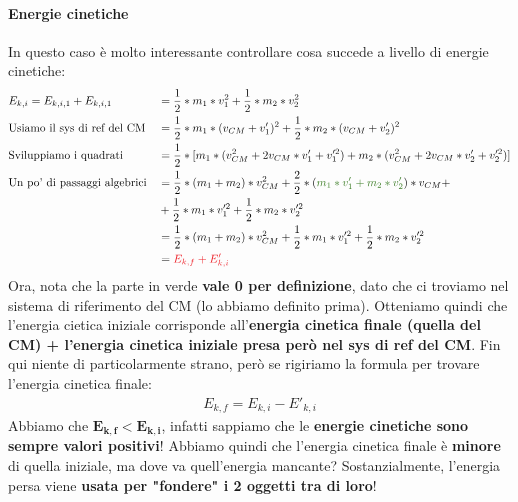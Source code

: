             \paragraph{Energie cinetiche}
                In questo caso è molto interessante controllare cosa succede a livello di energie cinetiche:
                \begin{align*}
                    & E_{k,i}=E_{k,i,1}+E_{k,i,1} &&=\frac{1}{2}*m_1*v_1^2+\frac{1}{2}*m_2*v_2^2\\
                    & \textrm{Usiamo il sys di ref del CM}
                    &&=\frac{1}{2}*m_1*(v_{CM}+v'_1)^2+\frac{1}{2}*m_2*(v_{CM}+v'_2)^2\\
                    & \textrm{Sviluppiamo i quadrati}
                    &&=\frac{1}{2}*[m_1*(v_{CM}^2+2v_{CM}*v'_1+v'^2_1)+m_2*(v_{CM} ^2+2v_{CM}*v'_2+v'^2_2)]\\
                    & \textrm{Un po' di passaggi algebrici}
                    &&=\frac{1}{2}*(m_1+m_2)*v_{CM}^2+\frac{2}{2}*(\textcolor{OliveGreen}{m_1*v'_1+m_2*v'_2})*v_{CM}+\\
                    & &&+\frac{1}{2}*m_1*v'^2_1+\frac{1}{2}*m_2*v'^2_2\\
                    & &&=\frac{1}{2}*(m_1+m_2)*v_{CM}^2+\frac{1}{2}*m_1*v'^2_1+\frac{1}{2}*m_2*v'^2_2\\
                    & && = \textcolor{Red}{E_{k, f} + E'_{k, i}}
                \end{align*}
                Ora, nota che la \textcolor{OliveGreen}{parte in verde} \textbf{vale 0 per definizione}, dato che ci troviamo nel sistema di riferimento del CM (lo abbiamo definito prima). Otteniamo quindi che l'energia cietica iniziale corrisponde all'\textbf{energia cinetica finale (quella del CM) + l'energia cinetica iniziale presa però nel sys di ref del CM}. Fin qui niente di particolarmente strano, però se rigiriamo la formula per trovare l'energia cinetica finale:
                \begin{align*}
                    E_{k, f}= E_{k, i}-E'_{k, i}
                \end{align*}
                Abbiamo che $\mathbf{E_{k, f} < E_{k, i}}$, infatti sappiamo che le \textbf{energie cinetiche sono sempre valori positivi}! Abbiamo quindi che l'energia cinetica finale è \textbf{minore} di quella iniziale, ma dove va quell'energia mancante? Sostanzialmente, l'energia persa viene \textbf{usata per "fondere" i 2 oggetti tra di loro}!

